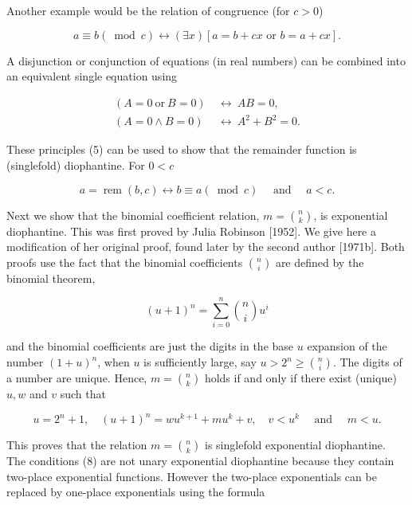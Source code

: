 \documentclass[11pt,leqno]{article}
\begin{document}
Another example would be the relation of congruence (for $c>0$)

\begin{equation*}
a \equiv b(\bmod c) \leftrightarrow(\exists x)[a=b+c x \text { or } b=a+c x] . \tag{4}\label{eq:4}
\end{equation*}

A disjunction or conjunction of equations (in real numbers) can be combined into an equivalent single equation using

\begin{equation*}
\begin{aligned}
(A=0\ \text{or}\ B=0)&\ \longleftrightarrow\ AB=0,\\
(A=0\land B=0)&\ \longleftrightarrow\ A^2+B^2=0.
\end{aligned} \tag{5}\label{eq:5}
\end{equation*}

These principles (5) can be used to show that the remainder function is (singlefold) diophantine. For $0<c$

\begin{equation*}
a=\operatorname{rem}(b, c) \leftrightarrow b \equiv a(\bmod c) \quad \text { and } \quad a<c . \tag{6}\label{eq:6}
\end{equation*}

Next we show that the binomial coefficient relation, $m=\binom{n}{k}$, is exponential diophantine. This was first proved by Julia Robinson [1952]. We give here a modification of her original proof, found later by the second author [1971b]. Both proofs use the fact that the binomial coefficients $\binom{n}{i}$ are defined by the binomial theorem,

\begin{equation*}
(u+1)^{n}=\sum_{i=0}^{n}\binom{n}{i} u^{i} \tag{7}\label{eq:7}
\end{equation*}

and the binomial coefficients are just the digits in the base $u$ expansion of the number $(1+u)^{n}$, when $u$ is sufficiently large, say $u>2^{n} \geq\binom{ n}{i}$. The digits of a number are unique. Hence, $m=\binom{n}{k}$ holds if and only if there exist (unique) $u, w$ and $v$ such that

\begin{equation*}
u=2^{n}+1, \quad(u+1)^{n}=w u^{k+1}+m u^{k}+v, \quad v<u^{k} \quad \text { and } \quad m<u . \tag{8}\label{eq:8}
\end{equation*}

This proves that the relation $m=\binom{n}{k}$ is singlefold exponential diophantine. The conditions (8) are not unary exponential diophantine because they contain two-place exponential functions. However the two-place exponentials can be replaced by one-place exponentials using the formula
\end{document}
